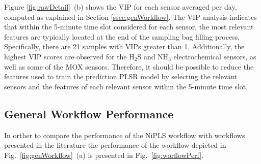 \documentclass[final,3p,times,twocolumn]{elsarticle}
\begin{document}
Figure \ref{fig:rawDetail}~(b) shows the VIP for each sensor averaged per day, computed as explained in Section \ref{ssec:genWorkflow}. The VIP analysis indicates that within the 5-minute time slot considered for each sensor, the most relevant features are typically located at the end of the sampling bag filling process. Specifically, there are 21 samples with VIPs greater than 1. Additionally, the highest VIP scores are observed for the H$_{2}$S and NH$_{3}$ electrochemical sensors, as well as some of the MOX sensors. Therefore, it should be possible to reduce the features used to train the prediction PLSR model by selecting the relevant sensors and the features of each relevant sensor within the 5-minute time slot.

\subsection{General Workflow Performance}
\label{ssec:workflowPerf}
In orther to compare the performance of the NiPLS workflow with workflows presented in the literature \cite{Burgues2021,Burgues2021_Ar} the performance of the workflow depicted in Fig.~\ref{fig:genWorkflow}~(a) is presented in Fig.~\ref{fig:worflowPerf}.
\end{document}
